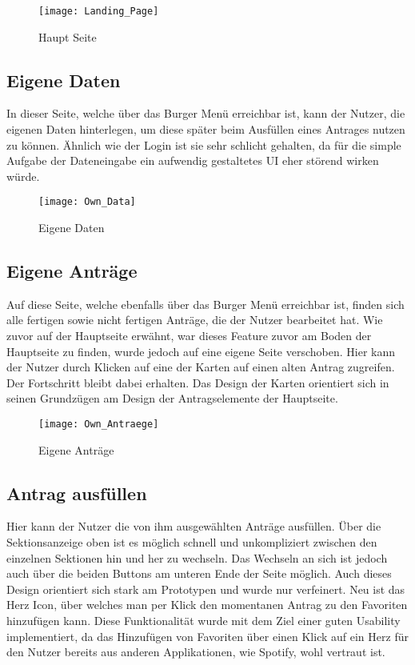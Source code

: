 \begin{figure}[h]
\centering
\texttt{[image: Landing\_Page]}
\caption{Haupt Seite}\label{Hautp Seite}
\end{figure}

\pagebreak

\subsection{Eigene Daten}\label{Eigene Daten}
In dieser Seite, welche über das Burger Menü erreichbar ist, kann der Nutzer, die eigenen
Daten hinterlegen, um diese später beim Ausfüllen eines Antrages nutzen zu können. Ähnlich
wie der Login ist sie sehr schlicht gehalten, da für die simple Aufgabe der Dateneingabe ein
aufwendig gestaltetes \ac{UI} eher störend wirken würde.

\begin{figure}[h]
\centering
\texttt{[image: Own\_Data]}
\caption{Eigene Daten}\label{Eigene Daten}
\end{figure}

\pagebreak

\subsection{Eigene Anträge}\label{Eigene Anträge}

Auf diese Seite, welche ebenfalls über das Burger Menü erreichbar ist, finden sich alle
fertigen sowie nicht fertigen Anträge, die der Nutzer bearbeitet hat. Wie zuvor auf der Hauptseite erwähnt, war dieses Feature zuvor am Boden der Hauptseite zu finden, wurde
jedoch auf eine eigene Seite verschoben. Hier kann der Nutzer durch Klicken auf eine der
Karten auf einen alten Antrag zugreifen. Der Fortschritt bleibt dabei erhalten. Das Design
der Karten orientiert sich in seinen Grundzügen am Design der Antragselemente der
Hauptseite.

\begin{figure}[h]
\centering
\texttt{[image: Own\_Antraege]}
\caption{Eigene Anträge}\label{Eigene Daten}
\end{figure}

\pagebreak

\subsection{Antrag ausfüllen}\label{Antrag Ausfüllen}

Hier kann der Nutzer die von ihm ausgewählten Anträge ausfüllen. Über die Sektionsanzeige
oben ist es möglich schnell und unkompliziert zwischen den einzelnen Sektionen hin und her
zu wechseln. Das Wechseln an sich ist jedoch auch über die beiden Buttons am unteren Ende
der Seite möglich. Auch dieses Design orientiert sich stark am Prototypen und wurde nur
verfeinert. Neu ist das Herz Icon, über welches man per Klick den momentanen Antrag zu den
Favoriten hinzufügen kann.
Diese Funktionalität wurde mit dem Ziel einer guten Usability implementiert,
da das Hinzufügen von Favoriten über einen Klick auf ein Herz für
den Nutzer bereits aus anderen Applikationen, wie Spotify, wohl vertraut ist.


